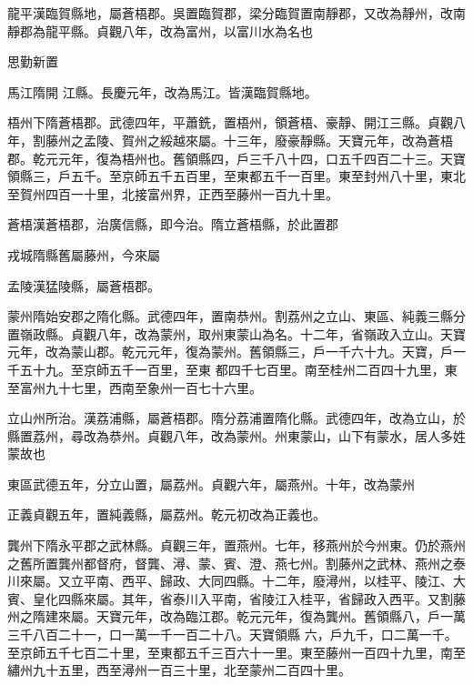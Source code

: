 \begin{pinyinscope}
 龍平漢臨賀縣地，屬蒼梧郡。吳置臨賀郡，梁分臨賀置南靜郡，又改為靜州，改南靜郡為龍平縣。貞觀八年，改為富州，以富川水為名也



 思勤新置



 馬江隋開
 江縣。長慶元年，改為馬江。皆漢臨賀縣地。



 梧州下隋蒼梧郡。武德四年，平蕭銑，置梧州，領蒼梧、豪靜、開江三縣。貞觀八年，割藤州之孟陵、賀州之綏越來屬。十三年，廢豪靜縣。天寶元年，改為蒼梧郡。乾元元年，復為梧州也。舊領縣四，戶三千八十四，口五千四百二十三。天寶領縣三，戶五千。至京師五千五百里，至東都五千一百里。東至封州八十里，東北至賀州四百一十里，北接富州界，正西至藤州一百九十里。



 蒼梧漢蒼梧郡，治廣信縣，即今治。隋立蒼梧縣，於此置郡



 戎城隋縣舊屬藤州，今來屬



 孟陵漢猛陵縣，屬蒼梧郡。



 蒙州隋始安郡之隋化縣。武德四年，置南恭州。割荔州之立山、東區、純義三縣分置嶺政縣。貞觀八年，改為蒙州，取州東蒙山為名。十二年，省嶺政入立山。天寶元年，改為蒙山郡。乾元元年，復為蒙州。舊領縣三，戶一千六十九。天寶，戶一千五十九。至京師五千一百里，至東
 都四千七百里。南至桂州二百四十九里，東至富州九十七里，西南至象州一百七十六里。



 立山州所治。漢荔浦縣，屬蒼梧郡。隋分荔浦置隋化縣。武德四年，改為立山，於縣置荔州，尋改為恭州。貞觀八年，改為蒙州。州東蒙山，山下有蒙水，居人多姓蒙故也



 東區武德五年，分立山置，屬荔州。貞觀六年，屬燕州。十年，改為蒙州



 正義貞觀五年，置純義縣，屬荔州。乾元初改為正義也。



 龔州下隋永平郡之武林縣。貞觀三年，置燕州。七年，移燕州於今州東。仍於燕州之舊所置龔州都督府，督龔、潯、蒙、賓、澄、燕七州。割藤州之武林、燕州之泰川來屬。又立平南、西平、歸政、大同四縣。十二年，廢潯州，以桂平、陵江、大賓、皇化四縣來屬。其年，省泰川入平南，省陵江入桂平，省歸政入西平。又割藤州之隋建來屬。天寶元年，改為臨江郡。乾元元年，復為龔州。舊領縣八，戶一萬三千八百二十一，口一萬一千一百二十八。天寶領縣
 六，戶九千，口二萬一千。至京師五千七百二十里，至東都五千三百六十一里。東至藤州一百四十九里，南至繡州九十五里，西至潯州一百三十里，北至蒙州二百四十里。




\end{pinyinscope}

